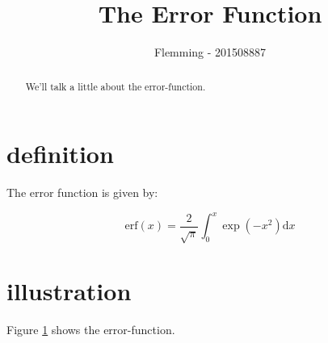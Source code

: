 \documentclass[twocolumn]{article}
\begin{document}
\title{The Error Function}
\author{Flemming - 201508887}
\date{}
\maketitle
\begin{abstract}
We'll talk a little about the error-function.
\end{abstract}

\section{definition}

The error function is given by:

\begin{equation}
\mathrm{erf}(x)=\frac{2}{\sqrt{\pi}}\int_0^x \exp(-x^2)\mathrm{d}x
\end {equation}

\section{illustration}

Figure \ref{plot} shows the error-function.

\begin{figure}

\label{plot}
\end{figure}
\end{document}
